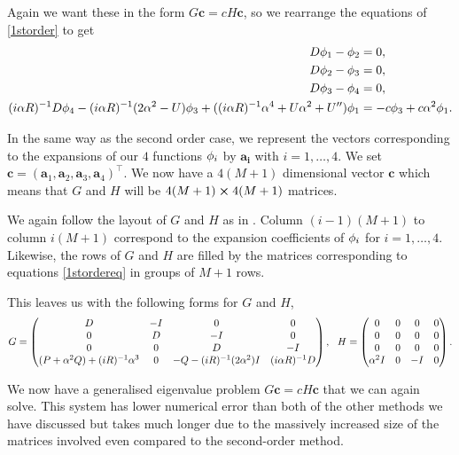 Again we want these in the form $ G \mathbf{c} = c H \mathbf{c} $, so we rearrange the equations of \eqref{1storder} to get 
\begin{subequations}
\begin{align}
    D \phi_1 - \phi_2 &= 0, \\
    D \phi_2 - \phi_3 &= 0, \\
    D \phi_3 - \phi_4 &= 0, \\
    (i \alpha R)^{-1} D \phi_4 - (i \alpha R)^{-1} (2 \alpha^2 - U) \phi_3 + ((i \alpha R)^{-1} \alpha^4 + U \alpha^2  + U'') \phi_1 &= - c \phi_3 + c \alpha^2 \phi_1.
\end{align}
\label{1stordereq}
\end{subequations}

In the same way as the second order case, we represent the vectors corresponding to the expansions of our $4$ functions $ \phi_i$ by $\mathbf{a_i} $ with $ i = 1, \dots, 4 $. We set $ \mathbf{c} = (\mathbf{a}_1, \mathbf{a}_2, \mathbf{a}_3, \mathbf{a}_4)^\intercal $. We now have a $ 4(M+1)$ dimensional vector $ \mathbf{c}$ which means that $G$ and $H$ will be $ 4(M+1) \cross 4(M+1) $ matrices.

We again follow the layout of $ G $ and $H$ as in \cite{bukhari1997spectral}. Column $ (i-1)(M+1) $ to column $ i (M+1) $ correspond to the expansion coefficients of $ \phi_i $ for $ i = 1, \dots, 4$. Likewise, the rows of $G$ and $H$ are filled by the matrices corresponding to equations \eqref{1stordereq} in groups of $ M+ 1$ rows.

This leaves us with the following forms for $G$ and $H$,
\begin{equation}
    G = \begin{pmatrix}
        D & -I & 0 & 0 \\
        0 & D & -I & 0 \\
        0 & 0 & D & -I \\
        (P + \al^2 Q) + (i R)^{-1} \al^3 & 0 & -Q - (i R)^{-1} (2 \al^2) I &   (i \al R)^{-1} D
    \end{pmatrix},\ \ 
    H = \begin{pmatrix}
        0 & 0 & 0 & 0 \\
        0 & 0 & 0 & 0 \\
        0 & 0 & 0 & 0 \\
        \al^2 I & 0 & -I & 0
    \end{pmatrix}.
\label{1stblockorder}
\end{equation}

We now have a generalised eigenvalue problem $ G \mathbf{c} = c H \mathbf{c} $ that we can again solve. This system has lower numerical error than both of the other methods we have discussed but takes much longer due to the massively increased size of the matrices involved even compared to the second-order method.

